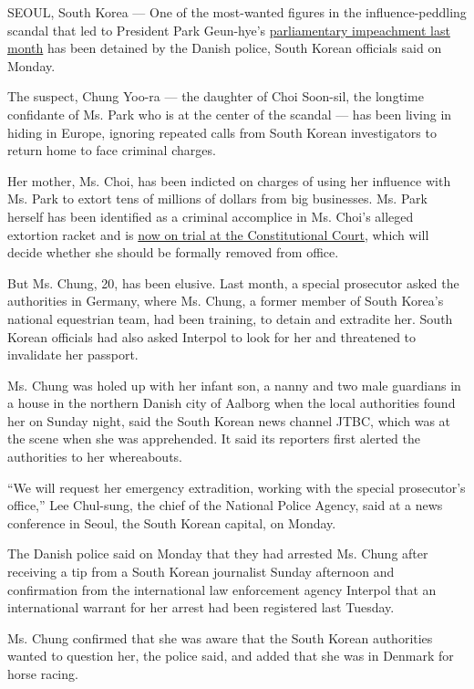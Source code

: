 SEOUL, South Korea --- One of the most-wanted figures in the
influence-peddling scandal that led to President Park Geun-hye's
\href{http://www.nytimes.com/2016/12/09/world/asia/south-korea-president-park-geun-hye-impeached.html}{parliamentary
impeachment last month} has been detained by the Danish police, South
Korean officials said on Monday.

The suspect, Chung Yoo-ra --- the daughter of Choi Soon-sil, the
longtime confidante of Ms. Park who is at the center of the scandal ---
has been living in hiding in Europe, ignoring repeated calls from South
Korean investigators to return home to face criminal charges.

Her mother, Ms. Choi, has been indicted on charges of using her
influence with Ms. Park to extort tens of millions of dollars from big
businesses. Ms. Park herself has been identified as a criminal
accomplice in Ms. Choi's alleged extortion racket and is
\href{http://www.nytimes.com/2016/12/22/world/asia/south-korea-president-park-impeachment.html?_r=0}{now
on trial at the Constitutional Court}, which will decide whether she
should be formally removed from office.

But Ms. Chung, 20, has been elusive. Last month, a special prosecutor
asked the authorities in Germany, where Ms. Chung, a former member of
South Korea's national equestrian team, had been training, to detain and
extradite her. South Korean officials had also asked Interpol to look
for her and threatened to invalidate her passport.

Ms. Chung was holed up with her infant son, a nanny and two male
guardians in a house in the northern Danish city of Aalborg when the
local authorities found her on Sunday night, said the South Korean news
channel JTBC, which was at the scene when she was apprehended. It said
its reporters first alerted the authorities to her whereabouts.

``We will request her emergency extradition, working with the special
prosecutor's office,'' Lee Chul-sung, the chief of the National Police
Agency, said at a news conference in Seoul, the South Korean capital, on
Monday.

The Danish police said on Monday that they had arrested Ms. Chung after
receiving a tip from a South Korean journalist Sunday afternoon and
confirmation from the international law enforcement agency Interpol that
an international warrant for her arrest had been registered last
Tuesday.

Ms. Chung confirmed that she was aware that the South Korean authorities
wanted to question her, the police said, and added that she was in
Denmark for horse racing.

